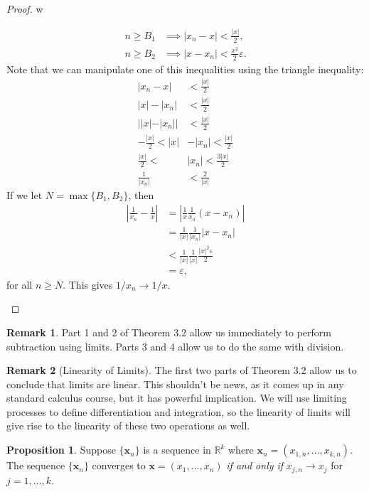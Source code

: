 \documentclass{article}
\newcommand{\R}{\mathbb{R}}
\newcommand{\x}{\mathbf{x}}
\theoremstyle{definition}
\newtheorem{proposition}{Proposition}[section]
\newtheorem{remark}{Remark}[section]
\begin{document}
\begin{proof}{\color{white}w}
\begin{enumerate}
\begin{align*}
				n\ge B_1&\implies |x_n-x|<\frac{|x|}{2},\\
				n\ge B_2&\implies |x-x_n|<\frac{x^2}{2}\varepsilon.
			\end{align*}  
			Note that we can manipulate one of this inequalities using the triangle inequality:
			\begin{align*}
				|x_n-x|&<\frac{|x|}{2}\\
				|x|-|x_n|&<\frac{|x|}{2}\\
				||x|-|x_n||&<\frac{|x|}{2}\\
				-\frac{|x|}{2}<|x|&-|x_n|<\frac{|x|}{2}\\
				\frac{|x|}{2}<&|x_n|<\frac{3|x|}{2}\\ \frac{1}{|x_n|}&<\frac{2}{|x|}
			\end{align*}
			If we let $ N=\max\{B_1,B_2\} $, then
			\begin{align*}
				\left\lvert\frac{1}{x_n}-\frac{1}{x}\right\rvert &=\left\lvert\frac{1}{x}\frac{1}{x_n}(x-x_n) \right\rvert\\
				&=\frac{1}{|x|}\frac{1}{|x_n|}|x-x_n|\\&<\frac{1}{|x|}\frac{1}{|x|}\frac{|x|^2\varepsilon}{2}
				\\&=\varepsilon,
			\end{align*}
			for all $ n\ge N $. This gives $ 1/x_n\to 1/x $. 
		\end{enumerate}
	\end{proof}
	\begin{remark}
		Part 1 and 2 of Theorem 3.2  allow us immediately to perform subtraction using limits. Parts 3 and 4 allow us to do the same with division. 
	\end{remark}
	\begin{remark}[Linearity of Limits]
		The first two parts of Theorem 3.2 allow us to conclude that limits are linear. This shouldn't be news, as it comes up in any standard calculus course, but it has powerful implication. We will use limiting processes to define differentiation and integration, so the linearity of limits will give rise to the linearity of these two operations as well.
	\end{remark}
	\begin{proposition}
		Suppose $ \{\x_n\} $ is a sequence in $ \R^k $ where $ \x_n=(x_{1,n},\ldots,x_{k,n}) $. The sequence $ \{\x_n\} $ converges to $ \x=(x_1,\ldots, x_n) $ \textit{if and only if} $ x_{j,n}\to x_j $ for $ j=1,\ldots,k $.  
	\end{proposition}
\end{document}
